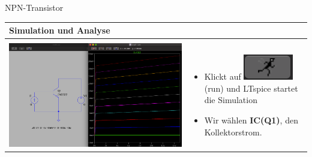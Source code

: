    \begin{frame}[t]{NPN-Transistor}
  
    \begin{spacing}{0.9} \begin{tiny}
    \begin{table}[h!]
      \begin{tabular}{p{5cm} p{5cm}}
        \hline
        \textbf{Simulation und Analyse} & \\
        \hline \\
        \begin{minipage}{.5\textwidth}
          \includegraphics[width=\linewidth]{pictures/analysis_3.png}
        \end{minipage} 
        & 
        \begin{minipage}{.5\textwidth}
        \begin{itemize}
          \item Klickt auf \includegraphics[scale=0.3]{pictures/run.png} (run) und LTspice startet die Simulation
        \item Wir wählen \textbf{IC(Q1)}, den Kollektorstrom.
        \end{itemize}
        \end{minipage} 
        \\
      \end{tabular}
    \end{table}
  \end{tiny} \end{spacing}
  

\end{frame}
